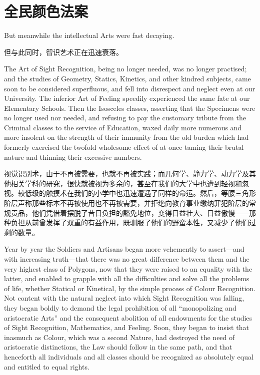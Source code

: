 \documentclass[12pt,UTF8]{ctexbook}
\begin{document}
\chapter{全民颜色法案}

But meanwhile the intellectual Arts were fast decaying.

但与此同时，智识艺术正在迅速衰落。

The Art of Sight Recognition, being no longer needed, was no longer practised; and the studies of Geometry, Statics, Kinetics, and other kindred subjects, came soon to be considered superfluous, and fell into disrespect and neglect even at our University. The inferior Art of Feeling speedily experienced the same fate at our Elementary Schools. Then the Isosceles classes, asserting that the Specimens were no longer used nor needed, and refusing to pay the customary tribute from the Criminal classes to the service of Education, waxed daily more numerous and more insolent on the strength of their immunity from the old burden which had formerly exercised the twofold wholesome effect of at once taming their brutal nature and thinning their excessive numbers.

视觉识别术，由于不再被需要，也就不再被实践；而几何学、静力学、动力学及其他相关学科的研究，很快就被视为多余的，甚至在我们的大学中也遭到轻视和忽视。较低级的触摸术在我们的小学中也迅速遭遇了同样的命运。然后，等腰三角形阶层声称那些标本不再被使用也不再被需要，并拒绝向教育事业缴纳罪犯阶层的常规贡品，他们凭借着摆脱了昔日负担的豁免地位，变得日益壮大、日益傲慢——那种负担从前曾发挥了双重的有益作用，既驯服了他们的野蛮本性，又减少了他们过剩的数量。

Year by year the Soldiers and Artisans began more vehemently to assert---and with increasing truth---that there was no great difference between them and the very highest class of Polygons, now that they were raised to an equality with the latter, and enabled to grapple with all the difficulties and solve all the problems of life, whether Statical or Kinetical, by the simple process of Colour Recognition. Not content with the natural neglect into which Sight Recognition was falling, they began boldly to demand the legal prohibition of all ``monopolizing and aristocratic Arts'' and the consequent abolition of all endowments for the studies of Sight Recognition, Mathematics, and Feeling. Soon, they began to insist that inasmuch as Colour, which was a second Nature, had destroyed the need of aristocratic distinctions, the Law should follow in the same path, and that henceforth all individuals and all classes should be recognized as absolutely equal and entitled to equal rights.
\end{document}
